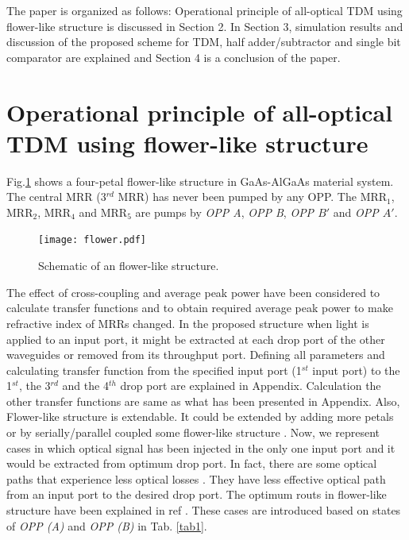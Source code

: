 \documentclass{osa-article}
\begin{document}
The paper is organized as follows: Operational principle of all-optical TDM using flower-like structure is discussed in Section 2. In Section 3, simulation results and discussion of the proposed scheme for TDM, half adder/subtractor and single bit comparator are explained and Section 4 is a conclusion of the paper.

\section{ Operational principle of all-optical TDM using flower-like structure}
\label{} 
Fig.\ref{fig1} shows a four-petal flower-like structure in GaAs-AlGaAs material system. The central MRR (3$^{rd}$ MRR) has never been pumped by any OPP. The MRR$_1$, MRR$_2$, MRR$_4$ and MRR$_5$ are pumps by \textit{OPP A}, \textit{OPP B}, \textit{OPP $B'$} and \textit{OPP $A'$}.
\begin{figure}[tb]
\centering
	\texttt{[image: flower.pdf]}
	\caption{Schematic of an flower-like structure.}
	\label{fig1}
\end{figure}
 The effect of cross-coupling and average peak power have been considered to calculate transfer functions and to obtain required average peak power to make refractive index of MRRs changed. In the proposed structure when light is applied to an input port, it might be extracted at each drop port of the other waveguides or removed from its throughput port. Defining all parameters and calculating transfer function from the specified input port (1$^{st}$ input port) to the 1$^{st}$, the 3$^{rd}$ and the 4$^{th}$ drop port are explained in Appendix. Calculation the other transfer functions are same as what has been presented in Appendix. Also, Flower-like structure is extendable. It could be extended by adding more petals or by serially/parallel coupled some flower-like structure \cite{razaghi2016design}. Now, we represent cases in which optical signal has been injected in the only one input port and it would be extracted from optimum drop port. In fact, there are some optical paths that experience less optical losses \cite{razaghi2016design}. They have less effective optical path from an input port to the desired drop port. The optimum routs in flower-like structure have been explained in ref \cite{razaghi2016design}. These cases are introduced based on states of \textit{OPP (A)} and \textit{OPP (B)} in Tab. \ref{tab1}.
\end{document}
